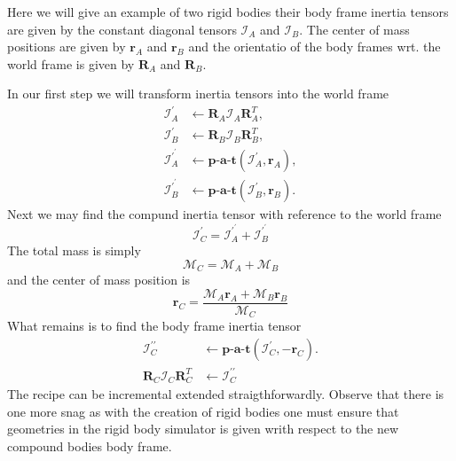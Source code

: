 \documentclass[twocolumn]{article}
\renewcommand{\vec}[1]{ \ensuremath{\mathbf{#1} } }
\newcommand{\mat}[1]{\ensuremath{\mathbf{#1} }}
\newcommand{\inertia}{\ensuremath{\mathcal{I} }}
\newcommand{\mass}{\ensuremath{\mathcal{M} }}
\begin{document}
Here we will give an example of two rigid bodies their body frame inertia
tensors are given by the constant diagonal tensors $\inertia_A$ and
$\inertia_B$. The center of mass positions are given by $\vec r_A$ and $\vec
r_B$ and the orientatio of the body frames wrt. the world frame is given by
$\mat R_A$ and $\mat R_B$.

In our first step we will transform inertia tensors into the world frame
\begin{subequations}
\begin{align}
  \inertia^{\prime}_A &\leftarrow \mat R_A \inertia_A \mat R_A^T,\\
  \inertia^{\prime}_B &\leftarrow \mat R_B \inertia_B \mat R_B^T,\\
  \inertia^{\prime^\prime}_A &\leftarrow \textbf{p-a-t}(\inertia_A^\prime,  \vec   r_A) ,\\
  \inertia^{\prime^\prime}_B &\leftarrow \textbf{p-a-t}(\inertia_B^\prime, \vec
  r_B) .
\end{align}
\end{subequations}
Next we may find the compund inertia tensor with reference to the world frame
\begin{equation}
  \inertia_C^\prime = \inertia^{\prime^\prime}_A + \inertia^{\prime^\prime}_B
\end{equation}
The total mass is simply
\begin{equation}
  \mass_C = \mass_A + \mass_B
\end{equation}
and the center of mass position is
\begin{equation}
  \vec r_C =  \frac{\mass_A \vec r_A + \mass_B \vec r_B}{ \mass_C}
\end{equation}
What remains is to find the body frame inertia tensor
\begin{subequations}
  \begin{align}
    \inertia_C^{\prime\prime} &\leftarrow \textbf{p-a-t}(\inertia_C^\prime, - \vec   r_C) .\\
    \mat R_C \inertia_C \mat R_C^T  &\leftarrow \inertia_C^{\prime\prime}
  \end{align}
\end{subequations}
The recipe can be incremental extended straigthforwardly. Observe that there is
one more snag as with the creation of rigid bodies one must ensure that
geometries in the rigid body simulator is given writh respect to the new
compound bodies body frame.
\end{document}

